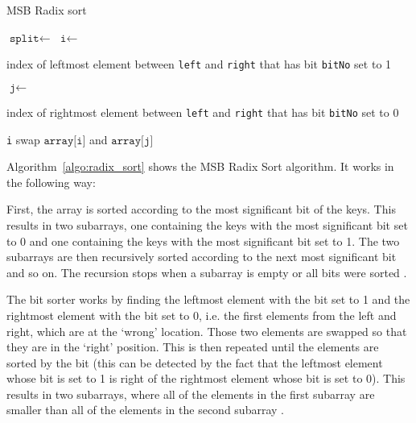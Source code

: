\documentclass[12pt, a4paper, openright, twoside]{tiarbeit}
\begin{document}
\begin{algorithm}
  \caption{MSB Radix sort}\label{algo:radix_sort}
  \small
  \begin{algorithmic}[1]
    \State {}
    \EndProcedure
     \Return \EndIf
    \State $\texttt{split} \gets$ 
    \State {}
    \State {}
    \EndIf
    \EndProcedure
    \State $\texttt{i}\gets$ \parbox[t][2\baselineskip]{.8\linewidth}{index of leftmost element between \texttt{left} and \texttt{right} that has bit \texttt{bitNo} set to 1}
    \label{lst:bit_sort_loop_bit_test_left}
    \State $\texttt{j}\gets$ \parbox[t][2\baselineskip]{.8\linewidth}{index of rightmost element between \texttt{left} and \texttt{right} that has bit \texttt{bitNo} set to 0}
    \label{lst:bit_sort_loop_bit_test_right}
     \Return \texttt{i} \EndIf
    \State swap $\texttt{array[i]}$ and $\texttt{array[j]}$
    \EndWhile
    \EndProcedure
  \end{algorithmic}
\end{algorithm}

Algorithm~\ref{algo:radix_sort} shows the MSB Radix Sort algorithm.
It works in the following way:

First, the array is sorted according to the most significant bit of the keys.
This results in two subarrays, one containing the keys with the most significant
bit set to 0 and one containing the keys with the most significant bit set to 1.
The two subarrays are then recursively sorted according to the next most
significant bit and so on.
The recursion stops when a subarray is empty or all bits were sorted
\citep[pp. 122-128]{knuth_taocp}.

The bit sorter works by finding the leftmost element with the bit set to 1
and the rightmost element with the bit set to 0, i.e. the first elements from the
left and right, which are at the `wrong' location. Those two
elements are swapped so that they are in the `right' position.
This is then repeated until the elements are sorted
by the bit (this can be detected by the fact that the leftmost element
whose bit is set to 1 is right of the rightmost element whose bit is set
to 0). This results in two subarrays, where all of the elements in the first
subarray are smaller than all of the elements in the second subarray
\citep[pp. 122-128]{knuth_taocp}.
\end{document}
